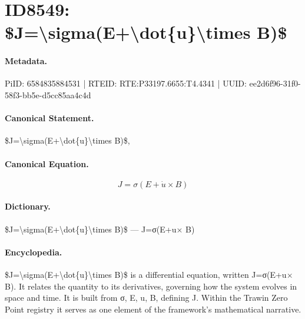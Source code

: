 \section*{ID8549: \$J=\textbackslash{}sigma(E+\textbackslash{}dot\{u\}\textbackslash{}times B)\$}
\paragraph{Metadata.}
PiID: 6584835884531 | RTEID: RTE:P33197.6655:T4.4341 | UUID: ee2d6f96-31f0-58f3-bb5e-d5cc85aa4c4d

\paragraph{Canonical Statement.}
\$J=\textbackslash{}sigma(E+\textbackslash{}dot\{u\}\textbackslash{}times B)\$,

\paragraph{Canonical Equation.}
\[
J=\sigma(E+\dot{u}\times B)
\]

\paragraph{Dictionary.}
\$J=\textbackslash{}sigma(E+\textbackslash{}dot\{u\}\textbackslash{}times B)\$ — J=σ(E+u× B)

\paragraph{Encyclopedia.}
\$J=\textbackslash{}sigma(E+\textbackslash{}dot\{u\}\textbackslash{}times B)\$ is a differential equation, written J=σ(E+u× B). It relates the quantity to its derivatives, governing how the system evolves in space and time. It is built from σ, E, u, B, defining J. Within the Trawin Zero Point registry it serves as one element of the framework's mathematical narrative.
